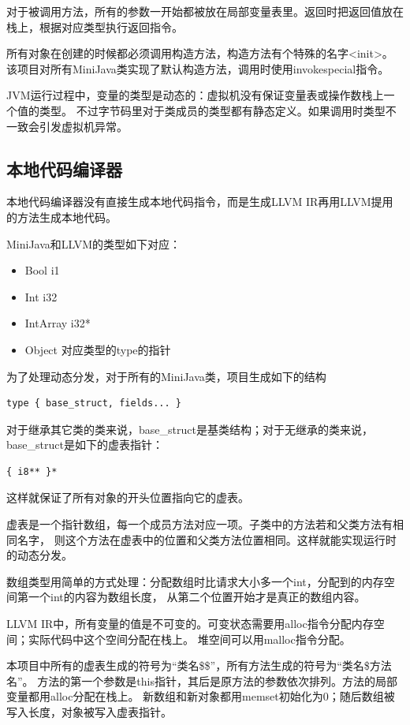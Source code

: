 \documentclass[a4paper]{article}
\begin{document}
对于被调用方法，所有的参数一开始都被放在局部变量表里。返回时把返回值放在栈上，根据对应类型执行返回指令。

所有对象在创建的时候都必须调用构造方法，构造方法有个特殊的名字<init>。
该项目对所有MiniJava类实现了默认构造方法，调用时使用invokespecial指令。

JVM运行过程中，变量的类型是动态的：虚拟机没有保证变量表或操作数栈上一个值的类型。
不过字节码里对于类成员的类型都有静态定义。如果调用时类型不一致会引发虚拟机异常。

\subsection{本地代码编译器}
本地代码编译器没有直接生成本地代码指令，而是生成LLVM IR再用LLVM提用的方法生成本地代码。

MiniJava和LLVM的类型如下对应：
\begin{itemize}
    \item Bool \Rightarrow{} i1
    \item Int \Rightarrow{} i32
    \item IntArray \Rightarrow{} i32*
    \item Object \Rightarrow{} 对应类型的type的指针
\end{itemize}

为了处理动态分发，对于所有的MiniJava类，项目生成如下的结构
\begin{lstlisting}[style=llvm]
    type { base_struct, fields... }
\end{lstlisting} \par
对于继承其它类的类来说，base\_struct是基类结构；对于无继承的类来说，base\_struct是如下的虚表指针：
\begin{lstlisting}[style=llvm]
    { i8** }*
\end{lstlisting} \par
这样就保证了所有对象的开头位置指向它的虚表。

虚表是一个指针数组，每一个成员方法对应一项。子类中的方法若和父类方法有相同名字，
则这个方法在虚表中的位置和父类方法位置相同。这样就能实现运行时的动态分发。

数组类型用简单的方式处理：分配数组时比请求大小多一个int，分配到的内存空间第一个int的内容为数组长度，
从第二个位置开始才是真正的数组内容。

LLVM IR中，所有变量的值是不可变的。可变状态需要用alloc指令分配内存空间；实际代码中这个空间分配在栈上。
堆空间可以用malloc指令分配。

本项目中所有的虚表生成的符号为“类名\$\$”，所有方法生成的符号为“类名\$方法名”。
方法的第一个参数是this指针，其后是原方法的参数依次排列。方法的局部变量都用alloc分配在栈上。
新数组和新对象都用memset初始化为0；随后数组被写入长度，对象被写入虚表指针。
\end{document}

